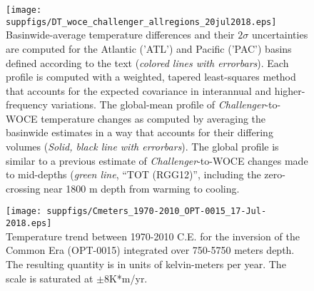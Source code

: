 \documentclass[12pt]{article}
\begin{document}
\begin{figure}%
\begin{center}
\texttt{[image: suppfigs/DT\_woce\_challenger\_allregions\_20jul2018.eps]} \\
 Basinwide-average temperature differences and their
$2\sigma$ uncertainties are computed for the Atlantic ('ATL') and Pacific
('PAC') basins defined according to the text ({\it colored lines with errorbars}). Each
profile is computed with a weighted, tapered least-squares method that
accounts for the expected covariance in interannual and
higher-frequency variations.  The global-mean profile of {\it
  Challenger}-to-WOCE temperature changes as computed by averaging the
basinwide estimates in a way that accounts for their differing volumes
({\it Solid, black line with errorbars}). The global profile is
similar to a previous estimate of {\it Challenger}-to-WOCE changes
made to mid-depths \cite{Roemmich-Gould-2012:135} ({\it green line},
``TOT (RGG12)'', including the zero-crossing near 1800 m depth from
warming to cooling.
\end{center} 
\end{figure}

\begin{figure}%
\begin{center}
\texttt{[image: suppfigs/Cmeters\_1970-2010\_OPT-0015\_17-Jul-2018.eps]}\\
Temperature trend between 1970-2010 C.E. for the inversion
of the Common Era (OPT-0015) integrated over 750-5750 meters depth.
The resulting quantity is in units of kelvin-meters per year. The scale is saturated at $\pm 8$K*m/yr.
\end{center} 
\end{figure}
\end{document}
